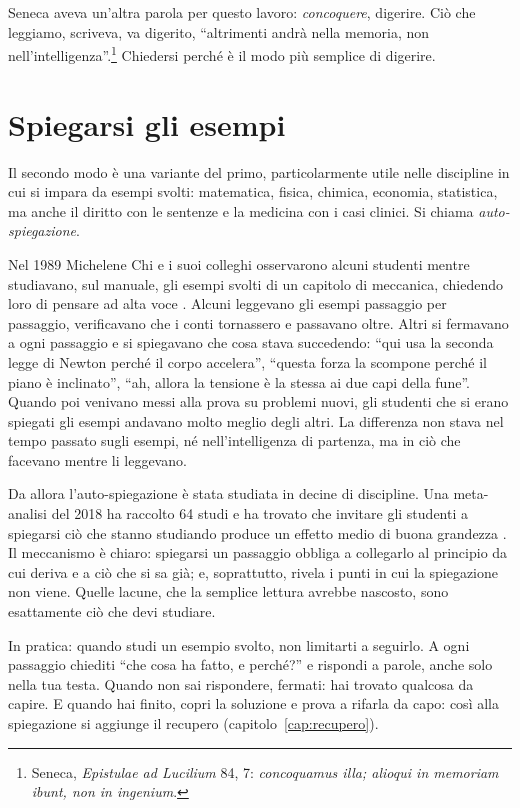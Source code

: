 Seneca aveva un'altra parola per questo lavoro: \emph{concoquere},
digerire. Ciò che leggiamo, scriveva, va digerito,
\enquote{altrimenti andrà nella memoria, non
nell'intelligenza}.\footnote{Seneca, \emph{Epistulae ad Lucilium} 84,
7: \emph{concoquamus illa; alioqui in memoriam ibunt, non in
ingenium}.} Chiedersi perché è il modo più semplice di digerire.

\section{Spiegarsi gli esempi}

Il secondo modo è una variante del primo, particolarmente utile nelle
discipline in cui si impara da esempi svolti: matematica, fisica,
chimica, economia, statistica, ma anche il diritto con le sentenze e la
medicina con i casi clinici. Si chiama \emph{auto-spiegazione}.

Nel 1989 Michelene Chi e i suoi colleghi osservarono alcuni studenti
mentre studiavano, sul manuale, gli esempi svolti di un capitolo di
meccanica, chiedendo loro di pensare ad alta voce
\parencite{chi1989}. Alcuni leggevano gli esempi passaggio per
passaggio, verificavano che i conti tornassero e passavano oltre. Altri
si fermavano a ogni passaggio e si spiegavano che cosa stava
succedendo: \enquote{qui usa la seconda legge di Newton perché il corpo
accelera}, \enquote{questa forza la scompone perché il piano è
inclinato}, \enquote{ah, allora la tensione è la stessa ai due capi
della fune}. Quando poi venivano messi alla prova su problemi nuovi, gli
studenti che si erano spiegati gli esempi andavano molto meglio degli
altri. La differenza non stava nel tempo passato sugli esempi, né
nell'intelligenza di partenza, ma in ciò che facevano mentre li
leggevano.

Da allora l'auto-spiegazione è stata studiata in decine di discipline.
Una meta-analisi del 2018 ha raccolto 64 studi e ha trovato che
invitare gli studenti a spiegarsi ciò che stanno studiando produce un
effetto medio di buona grandezza \parencite{bisra2018}. Il meccanismo è
chiaro: spiegarsi un passaggio obbliga a collegarlo al principio da cui
deriva e a ciò che si sa già; e, soprattutto, rivela i punti in cui la
spiegazione non viene. Quelle lacune, che la semplice lettura avrebbe
nascosto, sono esattamente ciò che devi studiare.

In pratica: quando studi un esempio svolto, non limitarti a seguirlo.
A ogni passaggio chiediti \enquote{che cosa ha fatto, e perché?} e
rispondi a parole, anche solo nella tua testa. Quando non sai
rispondere, fermati: hai trovato qualcosa da capire. E quando hai finito,
copri la soluzione e prova a rifarla da capo: così alla spiegazione si
aggiunge il recupero (capitolo~\ref{cap:recupero}).


